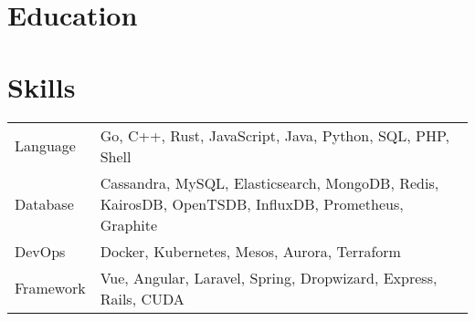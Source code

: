 \documentclass[11pt, letterpaper]{simple-cv}
\begin{document}




\section{Education}
{}

\section{Skills}
\begin{flushleft}
	\begin{tabular}{@{}ll@{}}
		Language  & Go, C++, Rust, JavaScript, Java, Python, SQL, PHP, Shell                                                  \\
		Database  & Cassandra, MySQL, Elasticsearch, MongoDB, Redis, KairosDB, OpenTSDB, InfluxDB, Prometheus, Graphite \\
		DevOps    & Docker, Kubernetes, Mesos, Aurora, Terraform                                                              \\
		Framework & Vue, Angular, Laravel, Spring, Dropwizard, Express, Rails, CUDA
	\end{tabular}
\end{flushleft}
\end{document}
